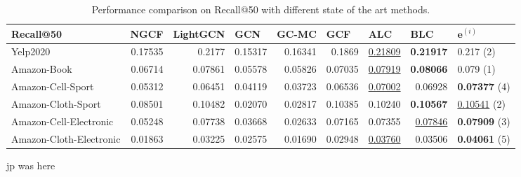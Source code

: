 \begin{table*}[h!]
    \centering
    \begin{tabular}{|l|r|r|r|r|r||r|r|l|}
        \hline
        Recall@50               & \multicolumn{1}{l|}{NGCF} & \multicolumn{1}{l|}{LightGCN} & \multicolumn{1}{l|}{GCN} & \multicolumn{1}{l|}{GC-MC} & \multicolumn{1}{l||}{GCF} & \multicolumn{1}{l|}{ALC} & \multicolumn{1}{l|}{BLC} & $\mathbf{e}^{(i)}$      \\ \hline
        Yelp2020                & 0.17535                   & 0.2177                        & 0.15317                  & 0.16341                    & 0.1869                    & \underline{0.21809}      & \textbf{0.21917}         & 0.217 (2)               \\ \hline
        Amazon-Book             & 0.06714                   & 0.07861                       & 0.05578                  & 0.05826                    & 0.07035                   & \underline{0.07919}      & \textbf{0.08066}         & 0.079 (1)               \\ \hline
        Amazon-Cell-Sport       & 0.05312                   & 0.06451                       & 0.04119                  & 0.03723                    & 0.06536                   & \underline{0.07002}      & 0.06928                  & \textbf{0.07377} (4)    \\ \hline
        Amazon-Cloth-Sport      & 0.08501                   & 0.10482                       & 0.02070                  & 0.02817                    & 0.10385                   & 0.10240                  & \textbf{0.10567}         & \underline{0.10541} (2) \\ \hline
        Amazon-Cell-Electronic  & 0.05248                   & 0.07738                       & 0.03668                  & 0.02633                    & 0.07165                   & 0.07355                  & \underline{0.07846}      & \textbf{0.07909} (3)    \\ \hline
        Amazon-Cloth-Electronic & 0.01863                   & 0.03225                       & 0.02575                  & 0.01690                    & 0.02948                   & \underline{0.03760}      & 0.03506                  & \textbf{0.04061} (5)    \\ \hline
    \end{tabular}
    \caption{Performance comparison on Recall@50 with different state of the art methods.}
    \label{tab:baselines-recall}
\end{table*}
jp was here
